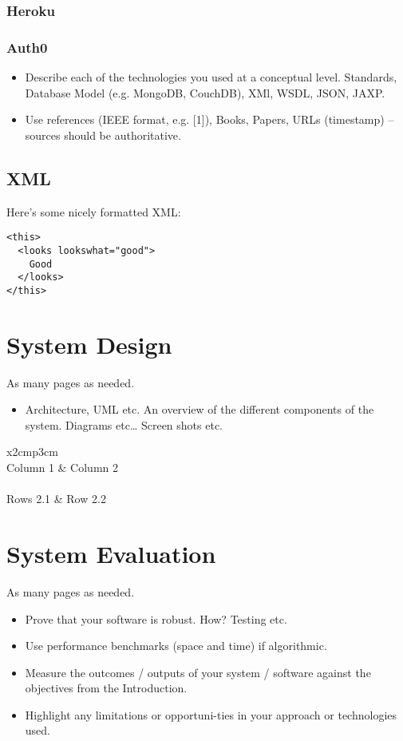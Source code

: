 \subsection{Heroku}
\subsection{Auth0}





\begin{itemize}
\item Describe each of the technologies you used at a conceptual level. Standards, Database Model (e.g. MongoDB, CouchDB), XMl, WSDL, JSON, JAXP.
\item Use references (IEEE format, e.g. [1]), Books, Papers, URLs (timestamp) – sources should be authoritative. 
\end{itemize}

\section{XML}
Here's some nicely formatted XML:
\begin{verbatim}
<this>
  <looks lookswhat="good">
    Good
  </looks>
</this>
\end{verbatim}

\chapter{System Design}
As many pages as needed.
\begin{itemize}
\item Architecture, UML etc. An overview of the different components of the system. Diagrams etc… Screen shots etc.
\end{itemize}

\begin{table}[h]
  \centering
  \begin{tabular}{x{2cm}p{3cm}}
    \toprule \\
    Column 1 & Column 2 \\
    \midrule \\
    Rows 2.1 & Row 2.2 \\
    \bottomrule
  \end{tabular}
  \caption{A table.}
  \label{table:mytable}
\end{table}

\chapter{System Evaluation}
As many pages as needed.
\begin{itemize}
\item Prove that your software is robust. How? Testing etc. 
\item Use performance benchmarks (space and time) if algorithmic.
\item Measure the outcomes / outputs of your system / software against the objectives from the Introduction.
\item Highlight any limitations or opportuni-ties in your approach or technologies used.
\end{itemize}

